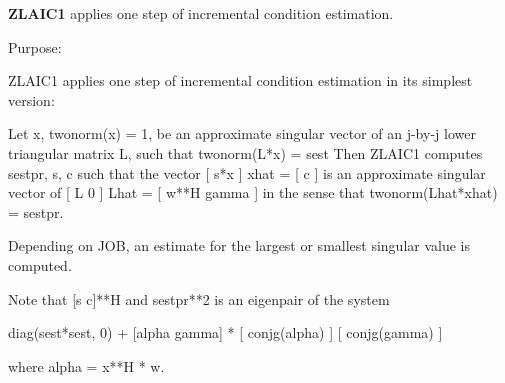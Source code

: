 {\bfseries Z\+L\+A\+I\+C1} applies one step of incremental condition estimation. 

 \begin{DoxyParagraph}{Purpose\+: }
\begin{DoxyVerb} ZLAIC1 applies one step of incremental condition estimation in
 its simplest version:

 Let x, twonorm(x) = 1, be an approximate singular vector of an j-by-j
 lower triangular matrix L, such that
          twonorm(L*x) = sest
 Then ZLAIC1 computes sestpr, s, c such that
 the vector
                 [ s*x ]
          xhat = [  c  ]
 is an approximate singular vector of
                 [ L       0  ]
          Lhat = [ w**H gamma ]
 in the sense that
          twonorm(Lhat*xhat) = sestpr.

 Depending on JOB, an estimate for the largest or smallest singular
 value is computed.

 Note that [s c]**H and sestpr**2 is an eigenpair of the system

     diag(sest*sest, 0) + [alpha  gamma] * [ conjg(alpha) ]
                                           [ conjg(gamma) ]

 where  alpha =  x**H * w.\end{DoxyVerb}
 
\end{DoxyParagraph}

